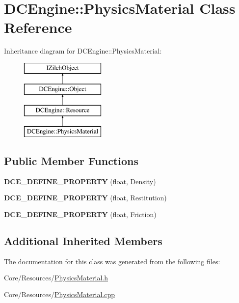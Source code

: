 \hypertarget{classDCEngine_1_1PhysicsMaterial}{\section{D\-C\-Engine\-:\-:Physics\-Material Class Reference}
\label{classDCEngine_1_1PhysicsMaterial}
}
Inheritance diagram for D\-C\-Engine\-:\-:Physics\-Material\-:\begin{figure}[H]
\begin{center}
\leavevmode
\includegraphics[height=4.000000cm]{classDCEngine_1_1PhysicsMaterial}
\end{center}
\end{figure}
\subsection*{Public Member Functions}
\begin{DoxyCompactItemize}
\item 
\hypertarget{classDCEngine_1_1PhysicsMaterial_a60a9efb3af281b2d612f0450479b2c70}{{\bfseries D\-C\-E\-\_\-\-D\-E\-F\-I\-N\-E\-\_\-\-P\-R\-O\-P\-E\-R\-T\-Y} (float, Density)}\label{classDCEngine_1_1PhysicsMaterial_a60a9efb3af281b2d612f0450479b2c70}

\item 
\hypertarget{classDCEngine_1_1PhysicsMaterial_a44ee9197b31eacfa69c8c595c47a7ba6}{{\bfseries D\-C\-E\-\_\-\-D\-E\-F\-I\-N\-E\-\_\-\-P\-R\-O\-P\-E\-R\-T\-Y} (float, Restitution)}\label{classDCEngine_1_1PhysicsMaterial_a44ee9197b31eacfa69c8c595c47a7ba6}

\item 
\hypertarget{classDCEngine_1_1PhysicsMaterial_a77cede0c8dc93280924ff3539cb106f4}{{\bfseries D\-C\-E\-\_\-\-D\-E\-F\-I\-N\-E\-\_\-\-P\-R\-O\-P\-E\-R\-T\-Y} (float, Friction)}\label{classDCEngine_1_1PhysicsMaterial_a77cede0c8dc93280924ff3539cb106f4}

\end{DoxyCompactItemize}
\subsection*{Additional Inherited Members}


The documentation for this class was generated from the following files\-:\begin{DoxyCompactItemize}
\item 
Core/\-Resources/\hyperlink{PhysicsMaterial_8h}{Physics\-Material.\-h}\item 
Core/\-Resources/\hyperlink{PhysicsMaterial_8cpp}{Physics\-Material.\-cpp}\end{DoxyCompactItemize}
